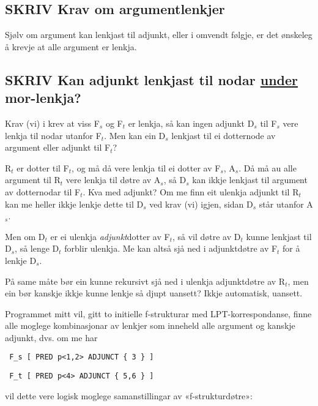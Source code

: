 \documentclass[11pt,a4paper,oneside,draft]{book}
\begin{document}
\subsection{\textbf{SKRIV} Krav om argumentlenkjer}
\label{sec-3.6.3}

Sjølv om argument kan lenkjast til adjunkt, eller i omvendt følgje,
er det ønskeleg å krevje at alle argument er lenkja. 

\subsection{\textbf{SKRIV} Kan adjunkt lenkjast til nodar \underline{under} mor-lenkja?}
\label{sec-3.6.4}

\label{SEC:merge-daughters}

Krav (vi) i \citet[s.~75]{dyvik2009lmp} krev at viss F$_s$ og F$_t$ er
lenkja, så kan ingen adjunkt D$_s$ til F$_s$ vere lenkja til nodar utanfor
F$_t$. Men kan ein D$_s$ lenkjast til ei dotternode av argument eller
adjunkt til F$_t$?

R$_t$ er dotter til F$_t$, og må då vere lenkja til ei dotter av F$_s$,
A$_s$. Då må au alle argument til R$_t$ vere lenkja til døtre av A$_s$, så
D$_s$ kan ikkje lenkjast til argument av dotternodar til F$_t$. Kva med
adjunkt? Om me finn eit ulenkja adjunkt til R$_t$ kan me heller ikkje
lenkje dette til D$_s$ ved krav (vi) igjen, sidan D$_s$ står utanfor
A$_s$.

Men om D$_t$ er ei ulenkja \emph{adjunkt}dotter av F$_t$, så vil døtre av
D$_t$ kunne lenkjast til D$_s$, så lenge D$_t$ forblir ulenkja. Me kan altså
sjå ned i adjunktdøtre av F$_t$ for å lenkje D$_s$. 

På same måte bør ein kunne rekursivt sjå ned i ulenkja adjunktdøtre av
R$_t$, men ein bør kanskje ikkje kunne lenkje så djupt uansett? Ikkje
automatisk, uansett.



Programmet mitt vil, gitt to initielle f-strukturar med
LPT-korrespondanse, finne alle moglege kombinasjonar av lenkjer som
inneheld alle argument og kanskje adjunkt, dvs. om me har

\begin{verbatim}
 F_s [ PRED p<1,2> ADJUNCT { 3 } ]
\end{verbatim}


\begin{verbatim}
 F_t [ PRED p<4> ADJUNCT { 5,6 } ]
\end{verbatim}


vil dette vere logisk moglege samanstillingar av «f-strukturdøtre»:
\end{document}
